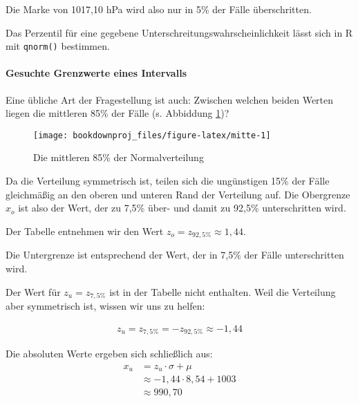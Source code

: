\documentclass[
  ngerman,
]{article}
\begin{document}
Die Marke von 1017,10 hPa wird also nur in 5\% der Fälle überschritten.

\begin{rtip}
Das Perzentil für eine gegebene Unterschreitungswahrscheinlichkeit lässt sich in R mit {\tt qnorm()} bestimmen.
\end{rtip}

\hypertarget{gesuchte-grenzwerte-eines-intervalls}{%
\paragraph{Gesuchte Grenzwerte eines Intervalls}\label{gesuchte-grenzwerte-eines-intervalls}}

Eine übliche Art der Fragestellung ist auch: Zwischen welchen beiden Werten liegen die mittleren 85\% der Fälle (s. Abbiddung \ref{fig:mitte})?

\begin{figure}[h]

{\centering \texttt{[image: bookdownproj\_files/figure-latex/mitte-1]} 

}

\caption{Die mittleren 85\% der Normalverteilung}\label{fig:mitte}
\end{figure}

Da die Verteilung symmetrisch ist, teilen sich die ungünstigen 15\% der Fälle gleichmäßig an den oberen und unteren Rand der Verteilung auf. Die Obergrenze \(x_o\) ist also der Wert, der zu 7,5\% über- und damit zu 92,5\% unterschritten wird.

Der Tabelle entnehmen wir den Wert \(z_o=z_{92,5\%}\approx1,44\).

Die Untergrenze ist entsprechend der Wert, der in 7,5\% der Fälle unterschritten wird.

Der Wert für \(z_u=z_{7,5\%}\) ist in der Tabelle nicht enthalten. Weil die Verteilung aber symmetrisch ist, wissen wir uns zu helfen:

\[
  \begin{aligned}
    z_u=z_{7,5\%}=-z_{92,5\%}\approx-1,44
  \end{aligned}
\]

Die absoluten Werte ergeben sich schließlich aus:
\[
  \begin{aligned}
    x_u&=z_u\cdot \sigma + \mu \\
    &\approx-1,44 \cdot 8,54 + 1003\\
    &\approx990,70
  \end{aligned}
\]
\end{document}
